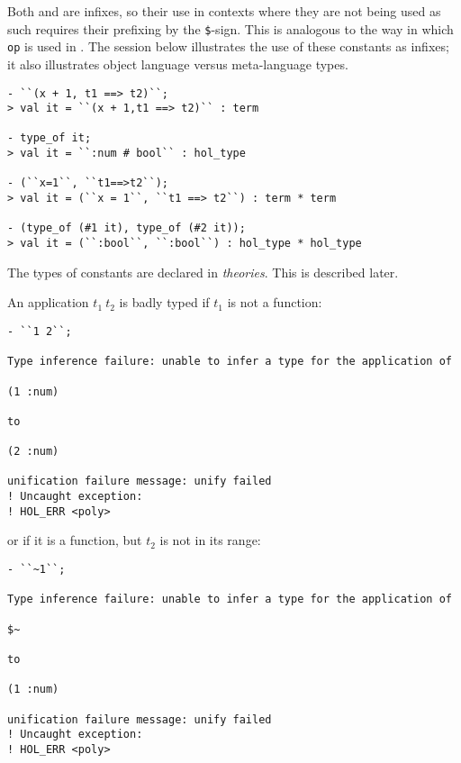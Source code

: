 \noindent Both \ml{+} and \ml{==>} are infixes, so their use in
contexts where they are not being used as such requires their
prefixing by the \texttt{\$}-sign.  This is analogous to the way in
which \texttt{op} is used in \ML. The session below illustrates the
use of these constants as infixes; it also illustrates object language
versus meta-language types.

\begin{session}\begin{verbatim}
- ``(x + 1, t1 ==> t2)``;
> val it = ``(x + 1,t1 ==> t2)`` : term

- type_of it;
> val it = ``:num # bool`` : hol_type

- (``x=1``, ``t1==>t2``);
> val it = (``x = 1``, ``t1 ==> t2``) : term * term

- (type_of (#1 it), type_of (#2 it));
> val it = (``:bool``, ``:bool``) : hol_type * hol_type
\end{verbatim}\end{session}

\noindent The types of constants are declared in {\it theories}.  This is
described later.

An application $t_1\ t_2$ is badly typed if $t_1$ is not a function:

\begin{session}\begin{verbatim}
- ``1 2``;

Type inference failure: unable to infer a type for the application of

(1 :num)

to

(2 :num)

unification failure message: unify failed
! Uncaught exception:
! HOL_ERR <poly>
\end{verbatim}\end{session}

\noindent or if it is a function, but $t_2$ is not in its range:

\begin{session}\begin{verbatim}
- ``~1``;

Type inference failure: unable to infer a type for the application of

$~

to

(1 :num)

unification failure message: unify failed
! Uncaught exception:
! HOL_ERR <poly>
\end{verbatim}\end{session}


